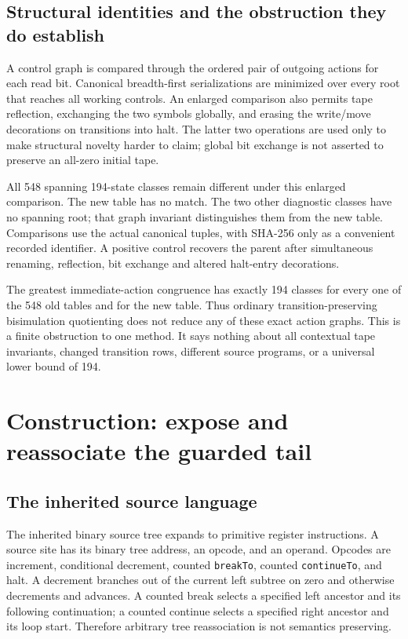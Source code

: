 \documentclass[10pt,a4paper]{article}
\theoremstyle{definition}
\begin{document}
\subsection{Structural identities and the obstruction they do establish}

A control graph is compared through the ordered pair of outgoing actions
for each read bit. Canonical breadth-first serializations are minimized
over every root that reaches all working controls. An enlarged comparison
also permits tape reflection, exchanging the two symbols globally, and
erasing the write/move decorations on transitions into halt. The latter
two operations are used only to make structural novelty harder to claim;
global bit exchange is not asserted to preserve an all-zero initial tape.

All 548 spanning 194-state classes remain different under this enlarged
comparison. The new table has no match. The two other diagnostic classes
have no spanning root; that graph invariant distinguishes them from the
new table. Comparisons use the actual canonical tuples, with SHA-256 only
as a convenient recorded identifier. A positive control recovers the
parent after simultaneous renaming, reflection, bit exchange and altered
halt-entry decorations.

The greatest immediate-action congruence has exactly 194 classes for
every one of the 548 old tables and for the new table. Thus ordinary
transition-preserving bisimulation quotienting does not reduce any of
these exact action graphs. This is a finite obstruction to one method.
It says nothing about all contextual tape invariants, changed transition
rows, different source programs, or a universal lower bound of 194.

\section{Construction: expose and reassociate the guarded tail}
\label{sec:construction}

\subsection{The inherited source language}

The inherited binary source tree expands to primitive register
instructions. A source site has its binary tree address, an opcode, and
an operand. Opcodes are increment, conditional decrement, counted
\texttt{breakTo}, counted \texttt{continueTo}, and halt. A decrement
branches out of the current left subtree on zero and otherwise decrements
and advances. A counted break selects a specified left ancestor and its
following continuation; a counted continue selects a specified right
ancestor and its loop start. Therefore arbitrary tree reassociation is
not semantics preserving.
\end{document}
